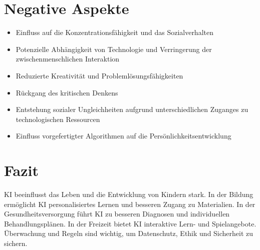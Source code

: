 \documentclass{article}
\begin{document}
\section{Negative Aspekte}

\begin{itemize}

    \item Einfluss auf die Konzentrationsfähigkeit und das Sozialverhalten
    \item Potenzielle Abhängigkeit von Technologie und Verringerung der zwischenmenschlichen Interaktion
    \item Reduzierte Kreativität und Problemlösungsfähigkeiten
    \item Rückgang des kritischen Denkens
    \item Entstehung sozialer Ungleichheiten aufgrund unterschiedlichen Zuganges zu technologischen Ressourcen
    \item Einfluss vorgefertigter Algorithmen auf die Persönlichkeitsentwicklung

\end{itemize}

\section{Fazit}

KI beeinflusst das Leben und die Entwicklung von Kindern stark. In der Bildung ermöglicht KI personalisiertes Lernen und besseren Zugang zu Materialien. In der Gesundheitsversorgung führt KI zu besseren Diagnosen und individuellen Behandlungsplänen. In der Freizeit bietet KI interaktive Lern- und Spielangebote. Überwachung und Regeln sind wichtig, um Datenschutz, Ethik und Sicherheit zu sichern. 

\printbibliography
\end{document}
